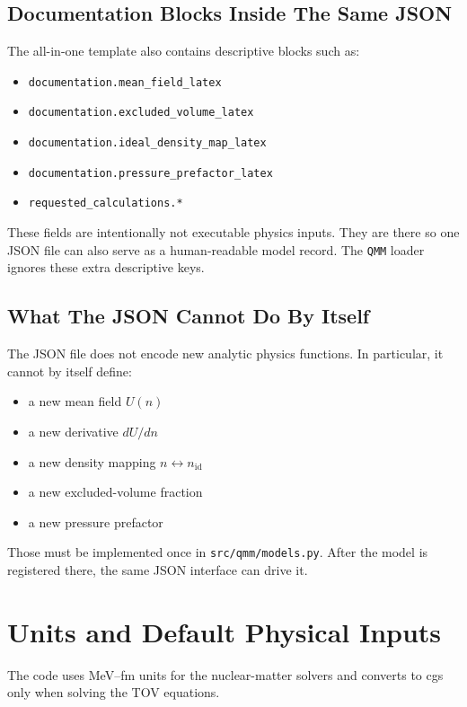 \documentclass[11pt]{article}
\begin{document}
\subsection{Documentation Blocks Inside The Same JSON}

The all-in-one template also contains descriptive blocks such as:

\begin{itemize}
\item \texttt{documentation.mean\_field\_latex}
\item \texttt{documentation.excluded\_volume\_latex}
\item \texttt{documentation.ideal\_density\_map\_latex}
\item \texttt{documentation.pressure\_prefactor\_latex}
\item \texttt{requested\_calculations.*}
\end{itemize}

These fields are intentionally not executable physics inputs.  They are there
so one JSON file can also serve as a human-readable model record.  The
\texttt{QMM} loader ignores these extra descriptive keys.

\subsection{What The JSON Cannot Do By Itself}

The JSON file does not encode new analytic physics functions.  In particular,
it cannot by itself define:

\begin{itemize}
\item a new mean field $U(n)$
\item a new derivative $dU/dn$
\item a new density mapping $n \leftrightarrow n_{\mathrm{id}}$
\item a new excluded-volume fraction
\item a new pressure prefactor
\end{itemize}

Those must be implemented once in \texttt{src/qmm/models.py}.  After the model
is registered there, the same JSON interface can drive it.

\section{Units and Default Physical Inputs}

The code uses MeV--fm units for the nuclear-matter solvers and converts to cgs
only when solving the TOV equations.
\end{document}
